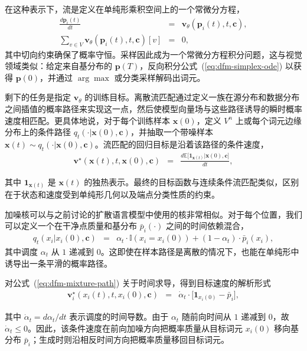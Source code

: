 在这种表示下，流是定义在单纯形乘积空间上的一个常微分方程，
\begin{eqnarray}
\frac{d\mathbf{p}_i(t)}{dt} & = & \mathbf{v}_{\theta}(\mathbf{p}_i(t),t,\mathbf{c}), \\
\sum_{v\in V}\mathbf{v}_{\theta}(\mathbf{p}_i(t),t,\mathbf{c})[v] & = & 0,
\label{eq:dfm-simplex-ode}
\end{eqnarray}
其中切向约束确保了概率守恒。采样因此成为一个常微分方程积分问题，这与视觉领域类似：给定来自基分布的 $\mathbf{p}(T)$，反向积分公式~(\ref{eq:dfm-simplex-ode}) 以获得 $\mathbf{p}(0)$，并通过 $\arg\max$ 或分类采样解码出词元。

剩下的任务是指定 $\mathbf{v}_\theta$ 的训练目标。离散流匹配通过定义一族在源分布和数据分布之间插值的概率路径来实现这一点，然后使模型向量场与这些路径诱导的瞬时概率速度相匹配。更具体地说，对于每个训练样本 $\mathbf{x}(0)$，定义 $V^n$ 上或每个词元边缘分布上的条件路径 $q_t(\cdot | \mathbf{x}(0), \mathbf{c})$，并抽取一个带噪样本 $\mathbf{x}(t)\sim q_t(\cdot | \mathbf{x}(0), \mathbf{c})$。流匹配的回归目标是沿着该路径的条件速度，
\begin{eqnarray}
\mathbf{v}^\star(\mathbf{x}(t),t,\mathbf{x}(0),\mathbf{c})
& = &
\frac{d \mathbb{E}\big[\mathbf{1}_{\mathbf{x}(t)} | \mathbf{x}(0), \mathbf{c} \big]}{dt},
\label{eq:dfm-target-velocity}
\end{eqnarray}

\noindent 其中 $\mathbf{1}_{\mathbf{x}(t)}$ 是 $\mathbf{x}(t)$ 的独热表示。最终的目标函数与连续条件流匹配类似，区别在于状态和速度受到单纯形几何以及端点分类性质的约束。

加噪核可以与之前讨论的扩散语言模型中使用的核非常相似。对于每个位置，我们可以定义一个在干净点质量和基分布 $\bar{p}_i(\cdot)$ 之间的时间依赖混合，
\begin{eqnarray}
q_t(x_i | x_i(0), \mathbf{c})
& = &
\alpha_t \cdot \mathbb{I}(x_i = x_i(0))
+
(1-\alpha_t) \cdot \bar{p}_i(x_i),
\label{eq:dfm-mixture-path}
\end{eqnarray}
其中调度 $\alpha_t$ 从 $1$ 递减到 $0$。这即使在样本路径是离散的情况下，也能在单纯形中诱导出一条平滑的概率路径。

对公式~(\ref{eq:dfm-mixture-path}) 关于时间求导，得到目标速度的解析形式
\begin{eqnarray}
\mathbf{v}^\star_i(x_i(t), t, x_i(0), \mathbf{c})
& = &
\dot{\alpha}_t \cdot \big[ \mathbf{1}_{x_i(0)} - \bar{p}_i \big],
\label{eq:dfm-analytic-velocity}
\end{eqnarray}

\noindent 其中 $\dot{\alpha}_t = d\alpha_t/dt$ 表示调度的时间导数。由于 $\alpha_t$ 随前向时间从 $1$ 递减到 $0$，故 $\dot{\alpha}_t\leq 0$。因此，该条件速度在前向加噪方向把概率质量从目标词元 $x_i(0)$ 移向基分布 $\bar{p}_i$；生成时则沿相反时间方向把概率质量移回目标词元。

